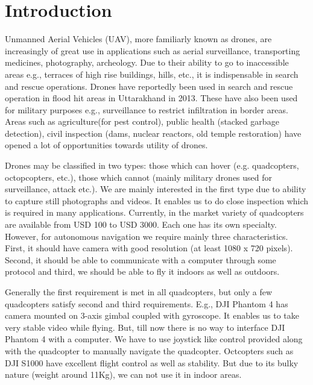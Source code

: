 \chapter{Introduction}
\label{ch:intro}
Unmanned Aerial Vehicles (UAV), more familiarly known as drones, are
increasingly of great use in applications such as aerial
surveillance\cite{dronesurvey1, dronesurvey3}, transporting
medicines\cite{dronedelivery1,dronedelivery2}, photography\cite{dronephoto1,
dronephoto2, dronephoto3}, archeology\cite{dronearchaeology}.
Due to their ability to go to inaccessible areas e.g., terraces of high rise
buildings, hills, etc., it is indispensable in search and rescue operations.
Drones have reportedly been used in search and rescue operation in flood hit
areas in Uttarakhand in 2013. These have also been used for military
purposes e.g., surveillance to restrict infiltration in border areas\cite{dronesurvey2}.
Areas such as agriculture(for pest control), public health (stacked garbage
detection), civil inspection (dams, nuclear reactors, old temple restoration) have 
opened a lot of opportunities towards utility of drones.

Drones may be classified in two types: those which can hover (e.g.
quadcopters, octopcopters, etc.), those which cannot (mainly military drones
used for surveillance, attack etc.). We are mainly interested in the first type due
to ability to capture still photographs and videos. It enables us to do
close inspection which is required in many applications. Currently, in the
market variety of quadcopters are available from USD 100 to USD 3000. Each one
has its own specialty. However, for autonomous navigation we require mainly
three characteristics. First, it should have camera with good resolution (at
least 1080 x 720 pixels). Second, it should be able to communicate with a
computer through some protocol and third, we should be able to fly it indoors as
well as outdoors.

Generally the first requirement is met in all quadcopters, but only a few
quadcopters satisfy second and third requirements. E.g., DJI Phantom 4 has
camera mounted on 3-axis gimbal coupled with gyroscope. It enables us to take
very stable video while flying. But, till now there is no way to interface DJI
Phantom 4 with a computer. We have to use joystick like control provided along
with the quadcopter to manually navigate the quadcopter.
Octcopters such as DJI S1000 have excellent flight control as well as
stability. But due to its bulky nature (weight around 11Kg), we can not use it
in indoor areas.

